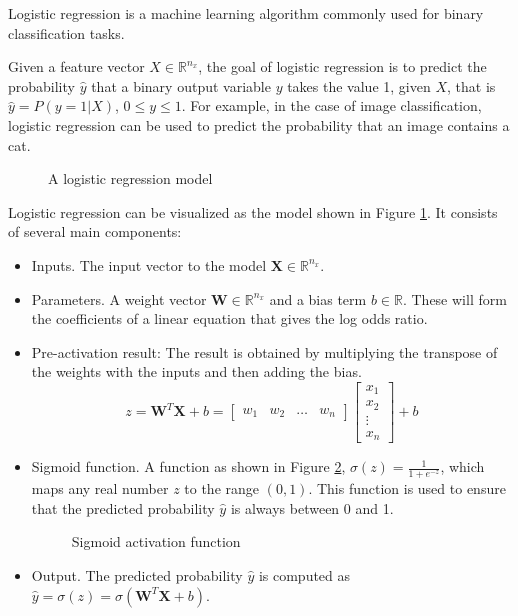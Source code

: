 		
		Logistic regression is a machine learning algorithm commonly used for binary classification tasks.
		
		Given a feature vector $X \in \mathbb{R}^{n_x}$, the goal of logistic regression is to predict the probability $\hat{y}$ that a binary output variable $y$ takes the value 1, given $X$, that is $\hat{y} = P(y=1|X)$, $0\le y\le1$. 
		For example, in the case of image classification, logistic regression can be used to predict the probability that an image contains a cat.
		
		\begin{figure}[H]
			\centering
			
			\caption{A logistic regression model}
			\label{fig:logisticregression}
		\end{figure}
		
		
		Logistic regression can be visualized as the model shown in Figure \ref{fig:logisticregression}. It consists of several main components:
		
		\begin{itemize}[]
			\item Inputs. The input vector to the model $\textbf{X} \in \mathbb{R}^{n_x}$.
			
			\item Parameters. A weight vector $\textbf{W} \in \mathbb{R}^{n_x}$ and a bias term $b \in \mathbb{R}$.  These will form the coefficients of a linear equation that gives the log odds ratio.
			
			\item Pre-activation result: The result is obtained by multiplying the transpose of the weights with the inputs and then adding the bias. 
			\begin{equation}
				z = \textbf{W}^{T}\textbf{X} + b = 
				\begin{bmatrix} 
					w_1 & w_2 & \dots & w_n
				\end{bmatrix}
				\begin{bmatrix} 
					x_1 \\ 
					x_2 \\ 
					\vdots \\ 
					x_n
				\end{bmatrix} + b
			\end{equation}

			
			
			\item Sigmoid function. A function as shown in Figure \ref{fig:sigmoid}, $\sigma(z) = \frac{1}{1 + e^{-z}}$, which maps any real number $z$ to the range $(0,1)$. This function is used to ensure that the predicted probability $\hat{y}$ is always between 0 and 1.
			
			\begin{figure}[H]
				\centering
				
				\caption{Sigmoid activation function}
				\label{fig:sigmoid}
			\end{figure}
			
			\item Output. The predicted probability $\hat{y}$ is computed as $\hat{y} = \sigma(z) = \sigma(\textbf{W}^{T}\textbf{X} + b)$.
		\end{itemize}
		\bigskip
		
